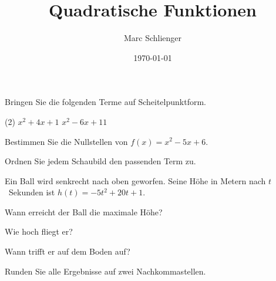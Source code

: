 \documentclass[onehalfspacing, 11pt, a4paper]{mtest}
\title{Quadratische Funktionen}
\author{Marc Schlienger}
\date{\today}
\begin{document}
\maketitle


\msection[Scheitelpunktform]
Bringen Sie die folgenden Terme auf Scheitelpunktform. 
\begin{mexccolumns}(2)
	\exc $x^2 + 4x + 1$
	\exc $x^2 - 6x + 11$
\end{mexccolumns}

\msection[Nullstellen]
Bestimmen Sie die Nullstellen von $f(x) = x^2 - 5x + 6$. 

\msectionr[Zuordnung]
Ordnen Sie jedem Schaubild den passenden Term zu. 


\msection[Sachaufgabe]
Ein Ball wird senkrecht nach oben geworfen. Seine Höhe in Metern nach
$t$~Sekunden ist $h(t) = -5t^2 + 20t + 1$.
\begin{menumerate}
	\item Wann erreicht der Ball die maximale Höhe? 
	\item Wie hoch fliegt er? 
	\item Wann trifft er auf dem Boden auf? 
\end{menumerate}

\begin{minfo*}
	Runden Sie alle Ergebnisse auf zwei Nachkommastellen.
\end{minfo*}

\mtotalscore

\mwish
\end{document}
